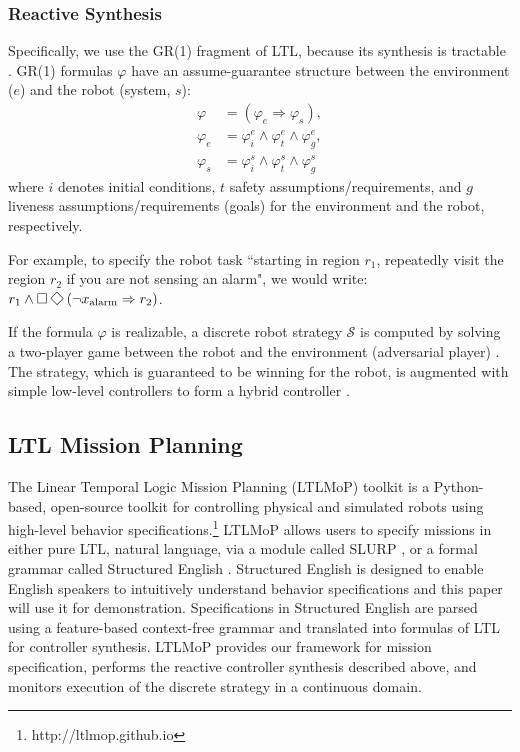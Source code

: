 \subsubsection*{Reactive Synthesis}
Specifically, we use the GR(1) fragment of LTL, because its synthesis is tractable \cite{piterman_06}. GR(1) formulas $\varphi$ have an assume-guarantee structure between the environment ($e$) and the robot (system, $s$):
\begin{align*}
	\varphi &= (\varphi_e \Rightarrow \varphi_s),\\
	\varphi_e &= \varphi_i^e \wedge \varphi_t^e \wedge \varphi_g^e,\\
	\varphi_s &= \varphi_i^s \wedge \varphi_t^s \wedge \varphi_g^s
\end{align*}
where $i$ denotes initial conditions, $t$ safety assumptions/requirements, and $g$ liveness assumptions/requirements (goals) for the environment and the robot, respectively.

For example, to specify the robot task ``starting in region $r_1$, repeatedly visit the region $r_2$ if you are not sensing an alarm", we would write: $r_1 \wedge \G\F \left(\neg x_{\text{alarm}} \Rightarrow  r_2 \right)$.

If the formula $\varphi$ is realizable, a discrete robot strategy $\mathcal{S}$ is computed by solving a two-player game between the robot and the environment (adversarial player) \cite{piterman_06}. The strategy, which is guaranteed to be winning for the robot, is augmented with simple low-level controllers to form a hybrid controller \cite{KGFP_TRO09}.

\subsection{LTL Mission Planning}\label{preliminariesB}

The Linear Temporal Logic Mission Planning (LTLMoP) toolkit \cite{Finucane2010} is a Python-based, open-source toolkit for controlling physical and simulated robots using high-level behavior specifications.\footnote{http://ltlmop.github.io} 
LTLMoP allows users to specify missions in either pure LTL, natural language, via a module called SLURP \cite{RamanRSS2013}, or a formal grammar called Structured English \cite{JFRKGICRA12}. 
Structured English is designed to enable English speakers to intuitively understand behavior specifications and this paper will use it for demonstration. 
Specifications in Structured English are parsed using a feature-based context-free grammar and translated into formulas of LTL for controller synthesis. 
LTLMoP provides our framework for mission specification, performs the reactive controller synthesis described above, and monitors execution of the discrete strategy in a continuous domain. 
